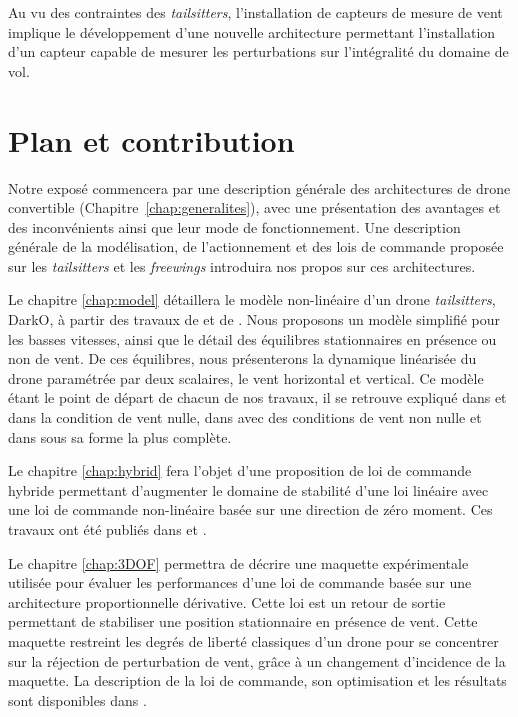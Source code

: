 Au vu des contraintes des \textit{tailsitters}, l'installation de capteurs de mesure de vent implique le développement d'une nouvelle architecture permettant l'installation d'un capteur capable de mesurer les perturbations sur l'intégralité du domaine de vol.


\section*{Plan et contribution}
Notre exposé commencera par une description générale des architectures de drone convertible (Chapitre~\ref{chap:generalites}), avec une présentation des avantages et des inconvénients ainsi que leur mode de fonctionnement. Une description générale de la modélisation, de l'actionnement et des lois de commande proposée sur les \textit{tailsitters} et les \textit{freewings} introduira nos propos sur ces architectures.

Le chapitre \ref{chap:model} détaillera le modèle non-linéaire d'un drone \textit{tailsitters}, DarkO, à partir des travaux de \cite{lustosaHal-03035938} et de \cite{olszaneckibarthHal-02542982}. Nous proposons un modèle simplifié pour les basses vitesses, ainsi que le détail des équilibres stationnaires en présence ou non de vent. De ces équilibres, nous présenterons la dynamique linéarisée du drone paramétrée par deux scalaires, le vent horizontal et vertical. Ce modèle étant le point de départ de chacun de nos travaux, il se retrouve expliqué dans \cite[Chapitre 2]{sansouStage} et \cite[Section II]{sansouECC} dans la condition de vent nulle, dans \cite[Section 2]{SANSOUACA} avec des conditions de vent non nulle et dans \cite[Section II]{sansouTCST} sous sa forme la plus complète.

Le chapitre \ref{chap:hybrid} fera l'objet d'une proposition de loi de commande hybride permettant d'augmenter le domaine de stabilité d'une loi linéaire avec une loi de commande non-linéaire basée sur une direction de zéro moment. Ces travaux ont été publiés dans  \cite{sansouStage} et \cite{sansouECC}.

Le chapitre \ref{chap:3DOF} permettra de décrire une maquette expérimentale utilisée pour évaluer les performances d'une loi de commande basée sur une architecture proportionnelle dérivative. Cette loi est un retour de sortie permettant de stabiliser une position stationnaire en présence de vent. Cette maquette restreint les degrés de liberté classiques d'un drone pour se concentrer sur la réjection de perturbation de vent, grâce à un changement d'incidence de la maquette. La description de la loi de commande, son optimisation et les résultats sont disponibles dans \cite{SANSOUACA}.

